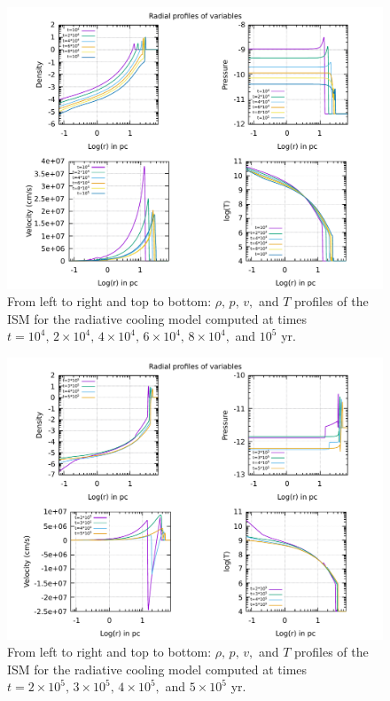 \documentclass{article}
\begin{document}
\begin{figure}[H]
	\centering
	\includegraphics[width=1 \linewidth]{radialprofilescool.pdf}
	\caption{From left to right and top to bottom: $\rho,\,p,\,v,$ and $T$ profiles of the ISM for the radiative cooling model computed at times $t=10^4,\,2\times10^4,\,4\times10^4,\,6\times10^4,\,8\times 10^4,$ and $10^5$ yr.}

	\label{fig:radialprcool}
\end{figure}
\begin{figure}[H]
	\centering
	\includegraphics[width=1 \linewidth]{radialprofileshightcool.pdf}
	\caption{From left to right and top to bottom: $\rho,\,p,\,v,$ and $T$ profiles of the ISM for the radiative cooling model computed at times $t=2\times10^5,\,3\times10^5,\,4\times10^5,$ and $5\times10^5$ yr.}


	\label{fig:radialprhightcool}
\end{figure}
\end{document}
